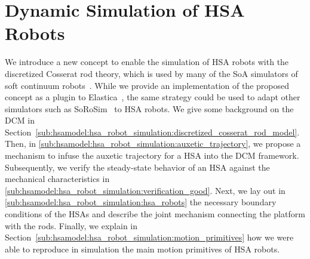 \section{Dynamic Simulation of HSA Robots}\label{sec:hsamodel:hsa_robot_simulation}
We introduce a new concept to enable the simulation of \gls{HSA} robots with the discretized Cosserat rod theory, which is used by many of the SoA simulators of soft continuum robots~\citep{naughton2021elastica, mathew2022sorosim}.
While we provide an implementation of the proposed concept as a plugin to Elastica~\citep{naughton2021elastica}, the same strategy could be used to adapt other simulators such as SoRoSim~\citep{mathew2022sorosim} to \gls{HSA} robots.
%
We give some background on the \gls{DCM} in Section~\ref{sub:hsamodel:hsa_robot_simulation:discretized_cosserat_rod_model}. Then, in \ref{sub:hsamodel:hsa_robot_simulation:auxetic_trajectory}, we propose a mechanism to infuse the auxetic trajectory for a \gls{HSA} into the \gls{DCM} framework. Subsequently, we verify the steady-state behavior of an \gls{HSA} against the mechanical characteristics in \ref{sub:hsamodel:hsa_robot_simulation:verification_good}. Next, we lay out in \ref{sub:hsamodel:hsa_robot_simulation:hsa_robots} the necessary boundary conditions of the \glspl{HSA} and describe the joint mechanism connecting the platform with the rods. Finally, we explain in Section~\ref{sub:hsamodel:hsa_robot_simulation:motion_primitives} how we were able to reproduce in simulation the main motion primitives of \gls{HSA} robots.

